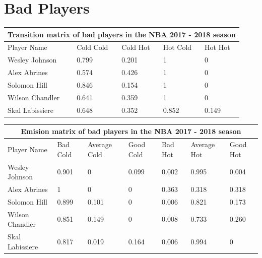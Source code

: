 \documentclass[12pt, authoryear]{elsarticle}
\begin{document}
\section{Bad Players} \label{bad_players}
\begin{tabular}{ |p{3cm}||p{2cm}|p{2cm}|p{2cm}|p{2cm}|  }
	\hline
	\multicolumn{5}{|c|}{Transition matrix of bad players in the NBA 2017 - 2018 season} \\
	\hline
	Player Name & Cold Cold & Cold Hot &Hot Cold & Hot Hot\\
	\hline
	Wesley Johnson&   0.799 &	0.201 &	1 &	0\\
	Alex Abrines&   0.574&	0.426&	1&	0\\
	Solomon Hill &0.846&	0.154&	1&	0\\
	Wilson Chandler&   0.641&	0.359&	1&	0\\
	Skal Labissiere& 0.648&	0.352&	0.852&	0.149\\
	\hline
\end{tabular}

\noindent\begin{tabular}{ |p{3cm}||p{1.5cm}|p{1.5cm}|p{1.5cm}|p{1.5cm}|p{1.5cm}|p{1.5cm}|  }
	\hline
	\multicolumn{7}{|c|}{Emision matrix of bad players in the NBA 2017 - 2018 season} \\
	\hline
	Player Name &Bad Cold& Average Cold&	Good Cold&	Bad Hot&	Average Hot&	Good Hot\\
	\hline
	Wesley Johnson&  0.901&	0&	 0.099&	0.002&	0.995&	0.004\\
	Alex Abrines&    1&	    0&    	0&  0.363&	0.318&	0.318\\
	Solomon Hill&    0.899&	0.101&	0&  0.006&	0.821&	0.173\\
	Wilson Chandler& 0.851& 0.149&	0&	0.008&	0.733&	0.260\\
	Skal Labissiere& 0.817&	0.019&	0.164&0.006&0.994&	0\\
	\hline
\end{tabular}
\end{document}
